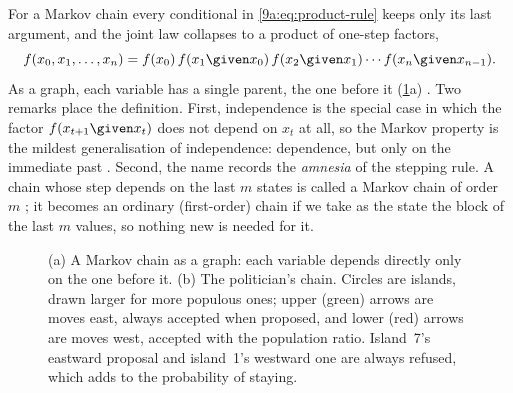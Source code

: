 For a Markov chain every conditional in \eqref{9a:eq:product-rule} keeps only its last
argument, and the joint law collapses to a product of one-step factors,
\begin{equation}
  f(x_0,x_1,\dots,x_n)=f(x_0)\,f(x_1\given x_0)\,f(x_2\given x_1)\cdots f(x_n\given x_{n-1}).
  \label{9a:eq:markov-joint}
\end{equation}
As a graph, each variable has a single parent, the one before it
(\cref{9a:fig:dag}a) . Two remarks place the definition. First, independence is
the special case in which the factor $f(x_{t+1}\given x_t)$ does not depend on $x_t$ at all,
so the Markov property is the mildest generalisation of independence: dependence, but only on
the immediate past . Second, the name records the
\emph{amnesia} of the stepping rule. A chain whose step depends on the last $m$ states is
called a Markov chain of order $m$ ; it becomes an ordinary
(first-order) chain if we take as the state the block of the last $m$ values, so nothing new is
needed for it.

\begin{figure}[htbp]
\centering
{}
\caption{(a) A Markov chain as a graph: each variable depends directly only on the one before
it. (b) The politician's chain. Circles are islands, drawn larger for more populous ones;
upper (green) arrows are moves east, always accepted when proposed, and lower (red) arrows
are moves west, accepted with the population ratio. Island~7's eastward proposal and
island~1's westward one are always refused, which adds to the probability of staying.}
\label{9a:fig:dag}
\end{figure}

